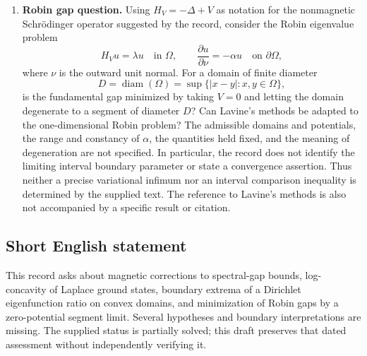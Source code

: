 \documentclass[11pt]{article}
\begin{document}
\begin{enumerate}
\item \textbf{Robin gap question.} Using \(H_V=-\Delta+V\) as notation for the nonmagnetic Schr\"odinger operator suggested by the record, consider the Robin eigenvalue problem
\[
H_Vu=\lambda u\quad\text{in }\Omega,
\qquad
\frac{\partial u}{\partial\nu}=-\alpha u
\quad\text{on }\partial\Omega,
\]
where \(\nu\) is the outward unit normal. For a domain of finite diameter
\[
D=\operatorname{diam}(\Omega)
=\sup\{|x-y|:x,y\in\Omega\},
\]
is the fundamental gap minimized by taking \(V=0\) and letting the domain degenerate to a segment of diameter \(D\)? Can Lavine's methods be adapted to the one-dimensional Robin problem? The admissible domains and potentials, the range and constancy of \(\alpha\), the quantities held fixed, and the meaning of degeneration are not specified. In particular, the record does not identify the limiting interval boundary parameter or state a convergence assertion. Thus neither a precise variational infimum nor an interval comparison inequality is determined by the supplied text. The reference to Lavine's methods is also not accompanied by a specific result or citation.
\end{enumerate}
\subsection{Short English statement}
This record asks about magnetic corrections to spectral-gap bounds, log-concavity of Laplace ground states, boundary extrema of a Dirichlet eigenfunction ratio on convex domains, and minimization of Robin gaps by a zero-potential segment limit. Several hypotheses and boundary interpretations are missing. The supplied status is partially solved; this draft preserves that dated assessment without independently verifying it.
\end{document}
